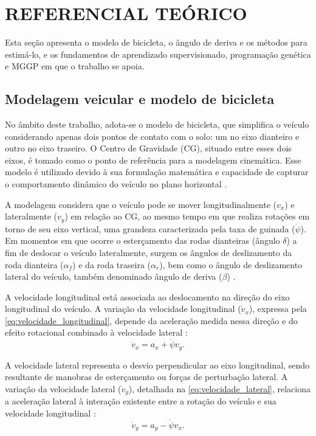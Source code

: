 \chapter{REFERENCIAL TEÓRICO}\label{sec:referencial}

Esta seção apresenta o modelo de bicicleta, o ângulo de deriva e os métodos para estimá-lo, e os fundamentos de aprendizado supervisionado, programação genética e MGGP em que o trabalho se apoia.

\section{Modelagem veicular e modelo de bicicleta}\label{sec:modelagem_veiculos}

No âmbito deste trabalho, adota-se o modelo de bicicleta, que simplifica o veículo considerando apenas dois pontos de contato com o solo: um no eixo dianteiro e outro no eixo traseiro. O Centro de Gravidade (CG), situado entre esses dois eixos, é tomado como o ponto de referência para a modelagem cinemática. Esse modelo é utilizado devido à sua formulação matemática e capacidade de capturar o comportamento dinâmico do veículo no plano horizontal \cite{viehweger2020}.

A modelagem considera que o veículo pode se mover longitudinalmente ($v_x$) e lateralmente ($v_y$) em relação ao CG, ao mesmo tempo em que realiza rotações em torno de seu eixo vertical, uma grandeza caracterizada pela taxa de guinada ($\dot{\psi}$). Em momentos em que ocorre o esterçamento das rodas dianteiras (ângulo $\delta$) a fim de deslocar o veículo lateralmente, surgem os ângulos de deslizamento da roda dianteira ($\alpha_f$) e da roda traseira ($\alpha_r$), bem como o ângulo de deslizamento lateral do veículo, também denominado ângulo de deriva ($\beta$) \cite{rajamani2012}.

A velocidade longitudinal está associada ao deslocamento na direção do eixo longitudinal do veículo. A variação da velocidade longitudinal ($\dot{v}_x$), expressa pela \autoref{eq:velocidade_longitudinal}, depende da aceleração medida nessa direção e do efeito rotacional combinado à velocidade lateral \cite{jiang2019}:
\begin{equation}
    \dot{v}_x = a_x + \dot{\psi} v_y.
    \label{eq:velocidade_longitudinal}
\end{equation}

A velocidade lateral representa o desvio perpendicular ao eixo longitudinal, sendo resultante de manobras de esterçamento ou forças de perturbação lateral. A variação da velocidade lateral ($\dot{v}_y$), detalhada na \autoref{eq:velocidade_lateral}, relaciona a aceleração lateral à interação existente entre a rotação do veículo e sua velocidade longitudinal \cite{jiang2019}:
\begin{equation}
    \dot{v}_y = a_y - \dot{\psi} v_x.
    \label{eq:velocidade_lateral}
\end{equation}

